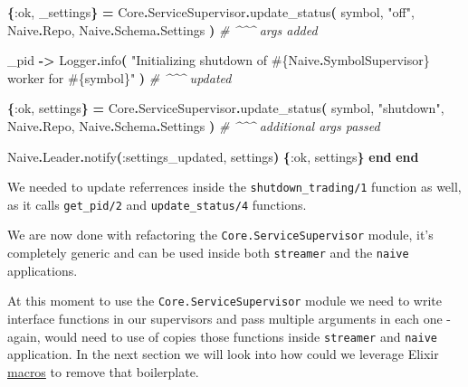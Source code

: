 \documentclass[
  oneside]{book}
\newenvironment{Shaded}{\begin{snugshade}}{\end{snugshade}}
\newcommand{\CommentTok}[1]{\textcolor[rgb]{0.56,0.35,0.01}{\textit{#1}}}
\newcommand{\ConstantTok}[1]{\textcolor[rgb]{0.56,0.35,0.01}{#1}}
\newcommand{\FunctionTok}[1]{\textcolor[rgb]{0.13,0.29,0.53}{\textbf{#1}}}
\newcommand{\KeywordTok}[1]{\textcolor[rgb]{0.13,0.29,0.53}{\textbf{#1}}}
\newcommand{\NormalTok}[1]{#1}
\newcommand{\OperatorTok}[1]{\textcolor[rgb]{0.81,0.36,0.00}{\textbf{#1}}}
\newcommand{\OtherTok}[1]{\textcolor[rgb]{0.56,0.35,0.01}{#1}}
\newcommand{\StringTok}[1]{\textcolor[rgb]{0.31,0.60,0.02}{#1}}
\newcommand{\VariableTok}[1]{\textcolor[rgb]{0.00,0.00,0.00}{#1}}
\begin{document}
\begin{Shaded}
\begin{Highlighting}[]
        \FunctionTok{\{}\VariableTok{:ok}\NormalTok{, \_settings}\FunctionTok{\}} \OperatorTok{=}
          \ConstantTok{Core}\OperatorTok{.}\ConstantTok{ServiceSupervisor}\OperatorTok{.}\NormalTok{update\_status}\FunctionTok{(}
\NormalTok{            symbol,}
            \StringTok{"off"}\NormalTok{,}
            \ConstantTok{Naive}\OperatorTok{.}\ConstantTok{Repo}\NormalTok{,}
            \ConstantTok{Naive}\OperatorTok{.}\ConstantTok{Schema}\OperatorTok{.}\ConstantTok{Settings}
          \FunctionTok{)} \CommentTok{\# \^{}\^{}\^{} args added}

\NormalTok{      \_pid }\OperatorTok{{-}\textgreater{}}
        \ConstantTok{Logger}\OperatorTok{.}\NormalTok{info}\FunctionTok{(}
          \StringTok{"Initializing shutdown of }\OtherTok{\#\{}\ConstantTok{Naive}\OperatorTok{.}\ConstantTok{SymbolSupervisor}\OtherTok{\}}\StringTok{ worker for }\OtherTok{\#\{}\NormalTok{symbol}\OtherTok{\}}\StringTok{"}
        \FunctionTok{)}                                     \CommentTok{\# \^{}\^{}\^{} updated}

        \FunctionTok{\{}\VariableTok{:ok}\NormalTok{, settings}\FunctionTok{\}} \OperatorTok{=}
          \ConstantTok{Core}\OperatorTok{.}\ConstantTok{ServiceSupervisor}\OperatorTok{.}\NormalTok{update\_status}\FunctionTok{(}
\NormalTok{            symbol,}
            \StringTok{"shutdown"}\NormalTok{,}
            \ConstantTok{Naive}\OperatorTok{.}\ConstantTok{Repo}\NormalTok{,}
            \ConstantTok{Naive}\OperatorTok{.}\ConstantTok{Schema}\OperatorTok{.}\ConstantTok{Settings}
          \FunctionTok{)} \CommentTok{\# \^{}\^{}\^{} additional args passed}

        \ConstantTok{Naive}\OperatorTok{.}\ConstantTok{Leader}\OperatorTok{.}\NormalTok{notify}\FunctionTok{(}\VariableTok{:settings\_updated}\NormalTok{, settings}\FunctionTok{)}
        \FunctionTok{\{}\VariableTok{:ok}\NormalTok{, settings}\FunctionTok{\}}
    \KeywordTok{end}
  \KeywordTok{end}
\end{Highlighting}
\end{Shaded}

We needed to update referrences inside the \texttt{shutdown\_trading/1} function as well, as it calls \texttt{get\_pid/2} and \texttt{update\_status/4} functions.

We are now done with refactoring the \texttt{Core.ServiceSupervisor} module, it's completely generic and can be used inside both \texttt{streamer} and the \texttt{naive} applications.

At this moment to use the \texttt{Core.ServiceSupervisor} module we need to write interface functions in our supervisors and pass multiple arguments in each one - again, would need to use of copies those functions inside \texttt{streamer} and \texttt{naive} application. In the next section we will look into how could we leverage Elixir \href{https://elixir-lang.org/getting-started/meta/macros.html}{macros} to remove that boilerplate.
\end{document}
